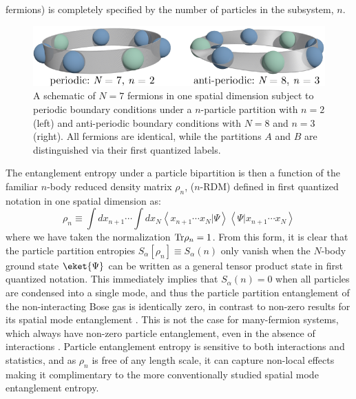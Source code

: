 fermions) is completely specified by the number of particles in the subsystem,
$n$. 
%
\begin{figure}[t]
\begin{center}
\includegraphics[width=0.7\columnwidth]{Images/ParticleEntanglement/particle_entanglement_boundary_conditions.pdf}
\end{center}
\caption{A schematic of $N=7$ fermions in one spatial dimension subject to
periodic boundary conditions under a $n$-particle partition with $n=2$ 
(left) and anti-periodic boundary conditions with $N=8$ and $n=3$ (right).  All fermions
are identical, while the partitions $A$ and $B$ are distinguished via
their first quantized labels.}
\label{fig:particle_partition}
\end{figure}
%
The entanglement entropy under a particle bipartition is then a function of the
familiar $n$-body reduced density matrix $\rho_n$, ($n$-RDM) defined in first
quantized notation in one spatial dimension as: 
%
\begin{equation}
\rho_n \equiv \int dx_{n+1} \cdots \int d x_{N}\left
\langle {x}_{n+1} \cdots {x}_{N} \vert \Psi \right
\rangle \left \langle \Psi \vert {x}_{n+1}\cdots {x_{N}} \right \rangle 
\label{eq:rhon}
\end{equation}
%
where we have taken the normalization ${\rm Tr} \rho_n = 1$. From this form, it
is clear that the particle partition \ren entropies $S_\alpha[\rho_n] \equiv
S_\alpha(n)$ only vanish when the $N$-body ground state $\eket{\Psi}$ can be
written as a general tensor product state in first quantized notation. This
immediately implies that $S_\alpha(n)=0$ when all particles are condensed into
a single mode, and thus the particle partition entanglement of
the non-interacting Bose gas is identically zero, in contrast to non-zero
results for its spatial mode entanglement \cite{Simon:2002it, Ding:2009gq}.
This is not the case for many-fermion systems, which always have non-zero
particle entanglement, even in the absence of interactions \cite{Zanardi:2002jw}.  Particle
entanglement entropy is sensitive to both interactions and 
statistics, and as $\rho_n$ is free of any length scale, it can capture
non-local effects making it complimentary to the more conventionally studied
spatial mode entanglement entropy.


